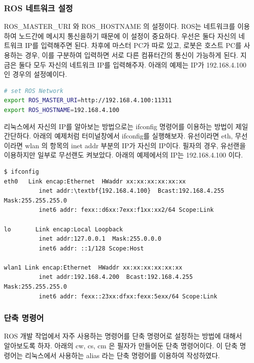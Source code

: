 \subsubsection{ROS 네트워크 설정}
ROS\_MASTER\_URI 와 ROS\_HOSTNAME 의 설정이다. ROS는 네트워크를 이용하여 노드간에 메시지 통신을하기 때문에 이 설정이 중요하다. 우선은 둘다 자신의 네트워크 IP를 입력해주면 된다. 차후에 마스터 PC가 따로 있고, 로봇은 호스트 PC를 사용하는 경우, 이를 구분하여 입력하면 서로 다른 컴퓨터간의 통신이 가능하게 된다. 지금은 둘다 모두 자신의 네트워크 IP를 입력해주자. 아래의 예제는 IP가 192.168.4.100 인 경우의 설정예이다. 
\\
\begin{lstlisting}[language=bash]
# set ROS Network
export ROS_MASTER_URI=http://192.168.4.100:11311
export ROS_HOSTNAME=192.168.4.100
\end{lstlisting}

\begin{exercise}[ifconfig]
리눅스에서 자신의 IP를 알아보는 방법으로는 ifconfig 명령어를 이용하는 방법이 제일 간단하다. 아래의 예제처럼 터미널창에서 ifconfig를 실행해보자. 유선이라면 eth, 무선이라면 wlan 의 항목의 inet addr 부분의 IP가 자신의 IP이다. 필자의 경우, 유선랜을 이용하지만 일부로 무선랜도 켜보았다. 아래의 예제에서의 IP는 192.168.4.100 이다.
\begin{lstlisting}[language=ROS, backgroundcolor=\color{ocre!10}, numbers=none]
$ ifconfig
eth0   Link encap:Ethernet  HWaddr xx:xx:xx:xx:xx:xx  
          inet addr:\textbf{192.168.4.100}  Bcast:192.168.4.255  Mask:255.255.255.0
          inet6 addr: fexx::d6xx:7exx:f1xx:xx2/64 Scope:Link

lo       Link encap:Local Loopback  
          inet addr:127.0.0.1  Mask:255.0.0.0
          inet6 addr: ::1/128 Scope:Host

wlan1 Link encap:Ethernet  HWaddr xx:xx:xx:xx:xx:xx
          inet addr:192.168.4.200  Bcast:192.168.4.255  Mask:255.255.255.0
          inet6 addr: fexx::23xx:dfxx:fexx:5exx/64 Scope:Link
\end{lstlisting}
\end{exercise}

\subsubsection{단축 명령어}
ROS 개발 작업에서 자주 사용하는 명령어를 단축 명령어로 설정하는 방법에 대해서 알아보도록 하자. 아래의 cw, cs, cm 은 필자가 만들어둔 단축 명령어이다. 이 단축 명령어는 리눅스에서 사용하는 alias 라는 단축 명령어를 이용하여 작성하였다. 

